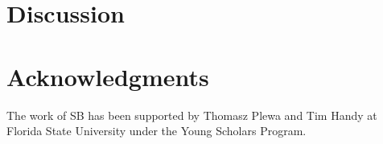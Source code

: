 \documentclass[iop]{emulateapj}
\begin{document}
\section{Discussion}


\cite{kifonidis+03}

\citep{kifonidis+06}

\citet{kifonidis+06}

\cite{kifonidis+03,kifonidis+06}

\citep{kifonidis+03,kifonidis+06}

\citet{kifonidis+03,kifonidis+06}

%
%
%
\section{Acknowledgments}\label{s:ack}
%
The work of SB has been supported by Thomasz Plewa and Tim Handy at Florida State University under the Young Scholars Program.
%
%
%


%
%
%
\end{document}
